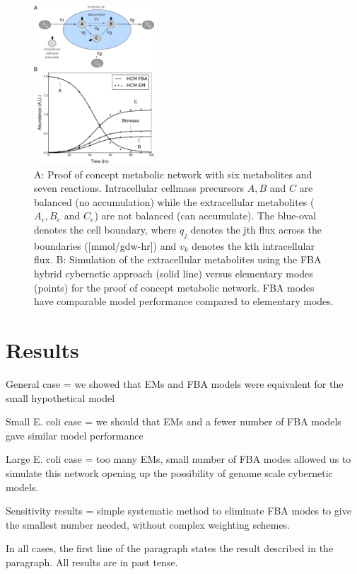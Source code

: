 \documentclass[10pt,twocolumn,twoside,final]{IEEEtran}
\begin{document}
\begin{figure}[!t]\centering
\includegraphics[width=0.40\textwidth]{./figs/Fig-1-GeneralModel-Results.pdf}
\caption{A: Proof of concept metabolic network with six metabolites and seven reactions.
Intracellular cellmass precursors $A,B$ and $C$ are balanced (no accumulation) while the extracellular metabolites ($A_{e},B_{e}$ and $C_{e}$) are not balanced (can accumulate). The blue-oval denotes the cell boundary, where $q_{j}$ denotes the jth flux across the boundaries ([mmol/gdw-hr]) and $v_{k}$ denotes the kth intracellular flux. B: Simulation of the extracellular metabolites using the FBA hybrid cybernetic approach (solid line) versus elementary modes (points) for the proof of concept metabolic network. FBA modes have comparable model performance compared to elementary modes.
}\label{fig:model-fitting}
\end{figure}

\section{Results}

General case = we showed that EMs and FBA models were equivalent for the small hypothetical model

Small E. coli case = we should that EMs and a fewer number of FBA models gave similar model performance

Large E. coli case = too many EMs, small number of FBA modes allowed us to simulate this network opening up the possibility of genome scale cybernetic models.

Sensitivity results = simple systematic method to eliminate FBA modes to give the smallest number needed, without complex weighting schemes.

In all cases, the first line of the paragraph states the result described in the paragraph. All results are in past tense.
\end{document}
